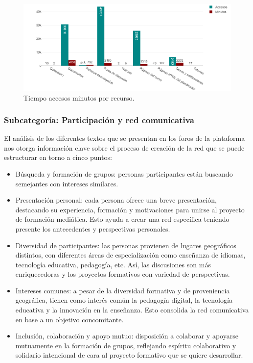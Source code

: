 \begin{figure}[htbp]
\centering
\begin{minipage}{.85\textwidth}
\caption{Tiempo accesos minutos por recurso.}
\label{fig-07}
\includegraphics[width=\textwidth]{Imagem7.png}
\end{minipage}
\end{figure}
	

\subsubsection{Subcategoría: Participación y red comunicativa}\label{sub-sub-sectionparticipación}
	
El análisis de los diferentes textos que se presentan en los foros de la
plataforma nos otorga información clave sobre el proceso de creación de
la red que se puede estructurar en torno a cinco puntos:
	
\begin{itemize}
\item
Búsqueda y formación de grupos: personas participantes están buscando
semejantes con intereses similares.
\item
Presentación personal: cada persona ofrece una breve presentación,
destacando su experiencia, formación y motivaciones para unirse al
proyecto de formación mediática. Esto ayuda a crear una red específica
teniendo presente los antecedentes y perspectivas personales.
\item
Diversidad de participantes: las personas provienen de lugares
geográficos distintos, con diferentes áreas de especialización como
enseñanza de idiomas, tecnología educativa, pedagogía, etc. Así, las
discusiones son más enriquecedoras y los proyectos formativos con
variedad de perspectivas.
\item
Intereses comunes: a pesar de la diversidad formativa y de
proveniencia geográfica, tienen como interés común la pedagogía
digital, la tecnología educativa y la innovación en la enseñanza. Esto
consolida la red comunicativa en base a un objetivo concomitante.
\item
Inclusión, colaboración y apoyo mutuo: disposición a colaborar y
apoyarse mutuamente en la formación de grupos, reflejando espíritu
colaborativo y solidario intencional de cara al proyecto formativo que
se quiere desarrollar.
\end{itemize}

